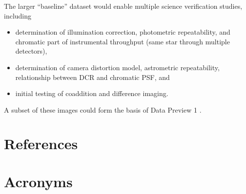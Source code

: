 \documentclass[SE,authoryear,toc,lsstdraft]{lsstdoc}
\begin{document}
The larger ``baseline'' dataset would enable multiple science verification studies, including
\begin{itemize}
  \item determination of illumination correction, photometric repeatability, and chromatic part of instrumental throughput (same star through multiple detectors),
  \item determination of camera distortion model, astrometric repeatability, relationship between DCR and chromatic PSF, and
  \item initial testing of coaddition and difference imaging.
\end{itemize}

A subset of these images could form the basis of Data Preview 1 .

\appendix
\section{References} \label{sec:bib}
\renewcommand{\refname}{} %


\section{Acronyms} \label{sec:acronyms}

\end{document}
